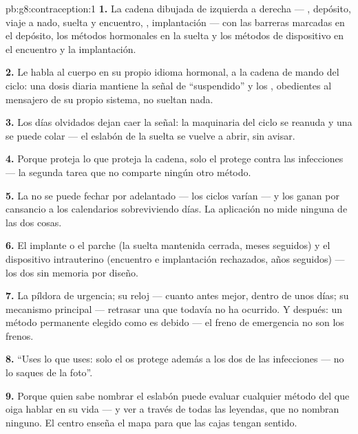 \begin{solution}{pb:g8:contraception:1}
\textbf{1.} La cadena dibujada de izquierda a derecha --- ,
depósito, viaje a nado, suelta y encuentro, , implantación
--- con las barreras marcadas en el depósito, los métodos hormonales en
la suelta y los métodos de dispositivo en el encuentro y la
implantación.

\textbf{2.} Le habla al cuerpo en su propio idioma hormonal, a la
cadena de mando del ciclo: una dosis diaria mantiene la señal de
``suspendido'' y los , obedientes al mensajero de su propio
sistema, no sueltan nada.

\textbf{3.} Los días olvidados dejan caer la señal: la maquinaria del
ciclo se reanuda y una  se puede colar --- el eslabón de la
suelta se vuelve a abrir, sin avisar.

\textbf{4.} Porque proteja lo que proteja la cadena, solo el
 protege contra las infecciones --- la segunda tarea que no
comparte ningún otro método.

\textbf{5.} La  no se puede fechar por adelantado --- los
ciclos varían --- y los  ganan por cansancio a los
calendarios sobreviviendo días. La aplicación no mide ninguna de las
dos cosas.

\textbf{6.} El implante o el parche (la suelta mantenida cerrada, meses
seguidos) y el dispositivo intrauterino (encuentro e implantación
rechazados, años seguidos) --- los dos sin memoria por diseño.

\textbf{7.} La píldora de urgencia; su reloj --- cuanto antes mejor,
dentro de unos días; su mecanismo principal --- retrasar una 
que todavía no ha ocurrido. Y después: un método permanente elegido
como es debido --- el freno de emergencia no son los frenos.

\textbf{8.} ``Uses lo que uses: solo el  os protege además
a los dos de las infecciones --- no lo saques de la foto''.

\textbf{9.} Porque quien sabe nombrar el eslabón puede evaluar
cualquier método del que oiga hablar en su vida --- y ver a través de
todas las leyendas, que no nombran ninguno. El centro enseña el mapa
para que las cajas tengan sentido.


\end{solution}
